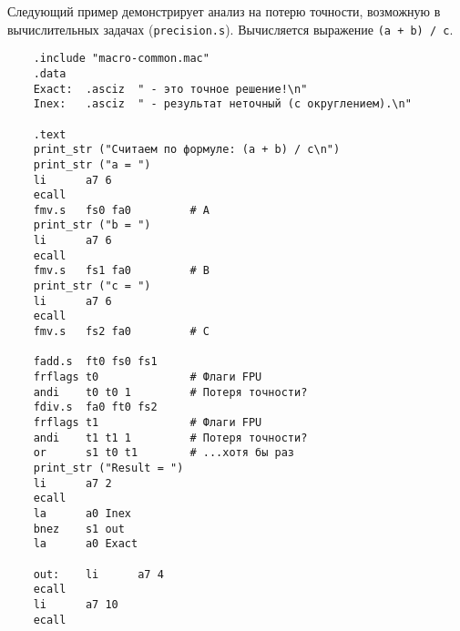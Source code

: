 Следующий пример демонстрирует анализ на потерю точности, возможную в вычислительных задачах (\verb|precision.s|). Вычисляется выражение \verb|(a + b) / c|.

\begin{verbatim}
    .include "macro-common.mac"
    .data
    Exact:  .asciz  " - это точное решение!\n"
    Inex:   .asciz  " - результат неточный (с округлением).\n"

    .text
    print_str ("Считаем по формуле: (a + b) / c\n")
    print_str ("a = ")
    li      a7 6
    ecall
    fmv.s   fs0 fa0         # A
    print_str ("b = ")
    li      a7 6
    ecall
    fmv.s   fs1 fa0         # B
    print_str ("c = ")
    li      a7 6
    ecall
    fmv.s   fs2 fa0         # C

    fadd.s  ft0 fs0 fs1
    frflags t0              # Флаги FPU
    andi    t0 t0 1         # Потеря точности?
    fdiv.s  fa0 ft0 fs2
    frflags t1              # Флаги FPU
    andi    t1 t1 1         # Потеря точности?
    or      s1 t0 t1        # ...хотя бы раз
    print_str ("Result = ")
    li      a7 2
    ecall
    la      a0 Inex
    bnez    s1 out
    la      a0 Exact

    out:    li      a7 4
    ecall
    li      a7 10
    ecall
\end{verbatim}



